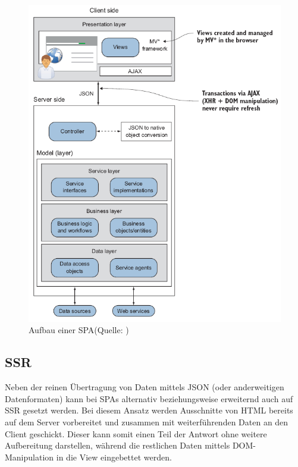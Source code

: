 \documentclass[a4paper,12pt,twoside]{scrreprt}
\begin{document}
\begin{figure}[ht]
    \centering
    \includegraphics[scale=0.60]{images/SPA_overview_Scott.png}
    \caption[Aufbau einer \acs{SPA}]{Aufbau einer \acs{SPA}\newline(Quelle: \cite[][Seite 6]{scott_spa_2015})}
    \label{fig:spa-overview}
\end{figure}

\subsection{\acl{SSR}}
\label{subsec:ssr}
Neben der reinen Übertragung von Daten mittels \acs{JSON} (oder anderweitigen Datenformaten) kann bei \acsp{SPA} alternativ beziehungsweise erweiternd auch auf \ac{SSR} gesetzt werden. Bei diesem Ansatz werden Ausschnitte von HTML bereits auf dem Server vorbereitet und zusammen mit weiterführenden Daten an den Client geschickt. Dieser kann somit einen Teil der Antwort ohne weitere Aufbereitung darstellen, während die restlichen Daten mittels \ac{DOM}-Manipulation in die View eingebettet werden. \parencite[][Seite 7]{scott_spa_2015}
\end{document}
